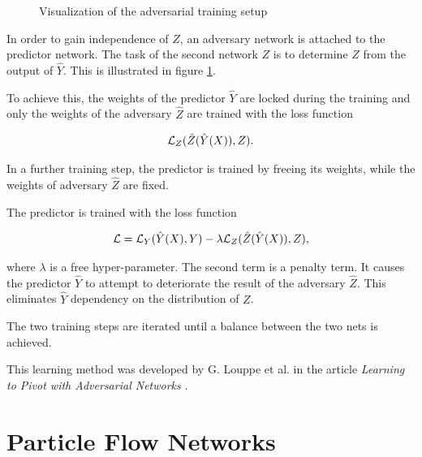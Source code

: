 \documentclass[12pt, a4paper]{thesis}
\begin{document}
\begin{figure}[hbtp]
  \caption{Visualization of the adversarial training setup}
  \label{adv-training}
\end{figure}

In order to gain independence of \(Z\), an adversary network is attached to
the predictor network. The task of the second network \( Z\) is to
determine \(Z\) from the output of \(\hat Y\). This is illustrated in
figure \ref{adv-training}.

To achieve this, the weights of the predictor \(\hat Y\) are locked
during the training and only the weights of the adversary \(\hat Z\)
are trained with the loss function

\begin{align}
  {\cal L}_Z(\hat Z(\hat Y(X)), Z).
\end{align}

In a further training step, the predictor is trained by freeing its
weights, while the weights of adversary \(\hat Z\) are fixed.

The predictor is trained with the loss function

\begin{align}
  {\cal L} = {\cal L}_Y(\hat Y(X), Y) - \lambda {\cal L}_Z(\hat Z(\hat Y(X)), Z),
\end{align}

where \(\lambda\) is a free hyper-parameter.  The second term is a
penalty term. It causes the predictor \(\hat Y\) to attempt to
deteriorate the result of the adversary \(\hat Z\). This eliminates
\(\hat Y\) dependency on the distribution of \(Z\).

The two training steps are iterated until a balance between the two
nets is achieved.

This learning method was developed by G. Louppe et al. in the article
\emph{Learning to Pivot with Adversarial Networks}
\cite{louppe16_learn_to_pivot}.

\section{Particle Flow Networks}
\label{sec:orgde973b7}
\end{document}
